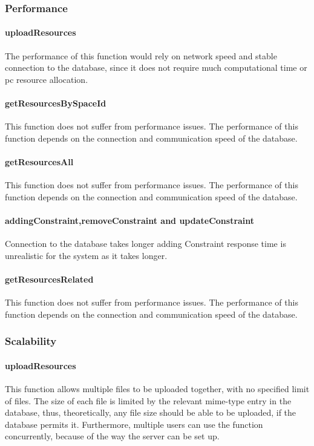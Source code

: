 \documentclass[a4paper]{article}
\begin{document}
\subsubsection {Performance}

\paragraph{uploadResources}
The performance of this function would rely on network speed and stable connection to the database, since it does not require much computational time or pc resource allocation.

\paragraph{getResourcesBySpaceId}
This function does not suffer from performance issues. The performance of this function depends on the connection and communication speed of the database.

\paragraph{getResourcesAll}
This function does not suffer from performance issues. The performance of this function depends on the connection and communication speed of the database.

\paragraph{addingConstraint,removeConstraint and updateConstraint}
Connection to the database takes longer adding Constraint response time is unrealistic for the system as it takes longer.

\paragraph{getResourcesRelated}
This function does not suffer from performance issues. The performance of this function depends on the connection and communication speed of the database.

\subsubsection {Scalability}

\paragraph{uploadResources}
This function allows multiple files to be uploaded together, with no specified limit of files. The size of each file is limited by the relevant mime-type entry in the database, thus, theoretically, any file size should be able to be uploaded, if the database permits it. Furthermore, multiple users can use the function concurrently, because of the way the server can be set up.
\end{document}

